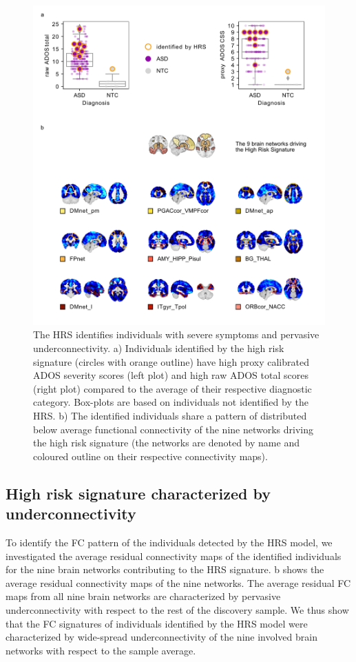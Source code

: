 \documentclass[9pt,lineno]{elife}
\begin{document}
\begin{figure}
\includegraphics[width=\linewidth]{fig3_profile}
    \caption{The HRS identifies individuals with severe symptoms and pervasive underconnectivity.
a) Individuals identified by the high risk signature (circles with orange outline) have high proxy calibrated ADOS severity scores (left plot) and high raw ADOS total scores (right plot) compared to the average of their respective diagnostic category. Box-plots are based on individuals not identified by the HRS. b) The identified individuals share a pattern of distributed below average functional connectivity of the nine networks driving the high risk signature (the networks are denoted by name and coloured outline on their respective connectivity maps).}
\label{fig:3_profile}
\end{figure}

\subsection{High risk signature characterized by underconnectivity}
To identify the FC pattern of the individuals detected by the HRS model, we investigated the average residual connectivity maps of the identified individuals for the nine brain networks contributing to the HRS signature. b shows the average residual connectivity maps of the nine networks. The average residual FC maps from all nine brain networks are characterized by pervasive underconnectivity with respect to the rest of the discovery sample. We thus show that the FC signatures of individuals identified by the HRS model were characterized by wide-spread underconnectivity of the nine involved brain networks with respect to the sample average.
\end{document}
